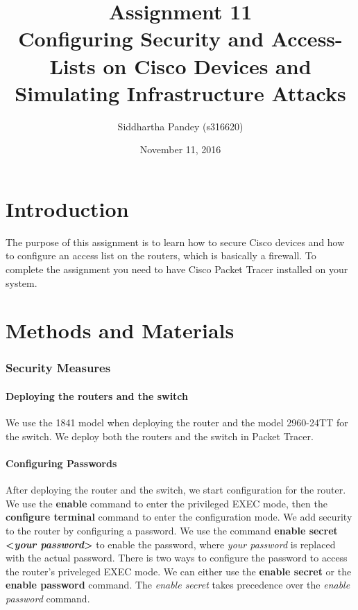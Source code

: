 \documentclass{article}
\date{November 11, 2016}
\title{\textbf{Assignment 11}\\Configuring Security and Access-Lists on Cisco Devices and
Simulating Infrastructure Attacks}
\author{Siddhartha Pandey (s316620)}
\begin{document}
\maketitle
\newpage
\tableofcontents
\newpage

\part{Introduction}

The purpose of this assignment is to learn how to secure Cisco devices and how to configure an access list on the routers, which is basically a firewall. To complete the assignment you need to have Cisco Packet Tracer installed on your system. 

\part{Methods and Materials}


\section{Security Measures}

\subsection{Deploying the routers and the switch}

We use the 1841 model when deploying the router and the model 2960-24TT for the switch. We deploy both the routers and the switch in Packet Tracer. 


\subsection{Configuring Passwords}
After deploying the router and the switch, we start configuration for the router. We use the \textbf{enable} command to enter the privileged EXEC mode, then the \textbf{configure terminal} command to enter the configuration mode. We add security to the router by configuring a password. We use the command \textbf{enable secret \textless\emph{your password}\textgreater} to enable the password, where \emph{your password} is replaced with the actual password. There is two ways to configure the password to access the router's priveleged EXEC mode. We can either use the \textbf{enable secret} or the \textbf{enable password} command. The \textit{enable secret} takes precedence over the \textit{enable password} command.
\end{document}
